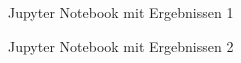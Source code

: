 \documentclass[a4paper]{report}
\begin{document}
\begin{figure}[H]
\centering
{}
\caption{Jupyter Notebook mit Ergebnissen 1}
\label{fig:Notebook1}
\end{figure}

\begin{figure}[H]
\centering
{}
\caption{Jupyter Notebook mit Ergebnissen 2}
\label{fig:Notebook2}
\end{figure}
\end{document}
